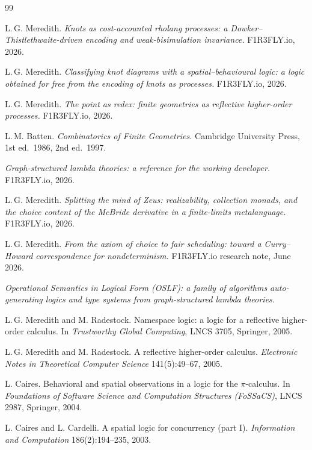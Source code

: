 \documentclass[11pt]{article}
\theoremstyle{plain}
\theoremstyle{definition}
\begin{document}
\begin{thebibliography}{99}

 L.\,G. Meredith. \emph{Knots as cost-accounted rholang processes: a
Dowker--Thistlethwaite-driven encoding and weak-bisimulation invariance.} F1R3FLY.io, 2026.

 L.\,G. Meredith. \emph{Classifying knot diagrams with a spatial--behavioural
logic: a logic obtained for free from the encoding of knots as processes.} F1R3FLY.io, 2026.

 L.\,G. Meredith. \emph{The point as redex: finite geometries as reflective
higher-order processes.} F1R3FLY.io, 2026.

 L.\,M. Batten. \emph{Combinatorics of Finite Geometries.} Cambridge University
Press, 1st ed.\ 1986, 2nd ed.\ 1997.

 \emph{Graph-structured lambda theories: a reference for the working developer.}
F1R3FLY.io, 2026.

 L.\,G. Meredith. \emph{Splitting the mind of Zeus: realizability, collection monads,
and the choice content of the McBride derivative in a finite-limits metalanguage.} F1R3FLY.io, 2026.

 L.\,G. Meredith. \emph{From the axiom of choice to fair scheduling: toward a
Curry--Howard correspondence for nondeterminism.} F1R3FLY.io research note, June 2026.

 \emph{Operational Semantics in Logical Form (OSLF): a family of algorithms
auto-generating logics and type systems from graph-structured lambda theories.}

 L.\,G. Meredith and M. Radestock. Namespace logic: a logic for a reflective
higher-order calculus. In \emph{Trustworthy Global Computing}, LNCS 3705, Springer, 2005.

 L.\,G. Meredith and M. Radestock. A reflective higher-order calculus.
\emph{Electronic Notes in Theoretical Computer Science} 141(5):49--67, 2005.

 L. Caires. Behavioral and spatial observations in a logic for the $\pi$-calculus.
In \emph{Foundations of Software Science and Computation Structures (FoSSaCS)}, LNCS 2987,
Springer, 2004.

 L. Caires and L. Cardelli. A spatial logic for concurrency (part I).
\emph{Information and Computation} 186(2):194--235, 2003.


\end{thebibliography}
\end{document}
